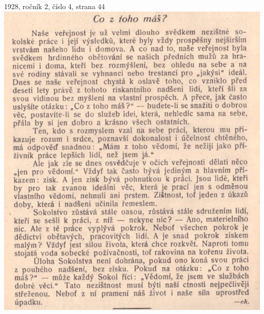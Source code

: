 \documentclass[11pt]{article}
\begin{document}
1928, ročník 2, číslo 4, strana 44 \\
\includegraphics[width=\imagewidth]{original/1928/Skener_20250320 (4).jpg}




\clearpage
\end{document}
